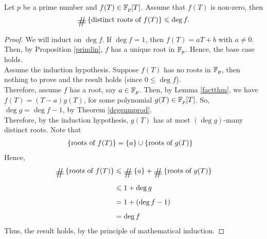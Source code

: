 \begin{theorem}
Let $p$ be a prime number and $f(T) \in \mathbb F_p[T]$. Assume that $f(T)$ is non-zero, then \[\card\set{\text{distinct roots of $f(T)$}} \leq \deg f.\]
\end{theorem}
\begin{proof}
We will induct on $\deg f$. If $\deg f = 1$, then $f(T) = aT + b$ with $a \neq \overline{0}$. Then, by Proposition \ref{primlin}, $f$ has a unique root in $\mathbb F_p$. Hence, the base case holds.\\[0.5em]
Assume the induction hypothesis. Suppose $f(T)$ has no roots in $\mathbb F_p$, then nothing to prove and the result holds (since $0 \leq \deg f$).\\[0.5em]
Therefore, assume $f$ has a root, say $a \in \mathbb F_p$. Then, by Lemma \ref{factthm}, we have $f(T) = (T - a)g(T)$, for some polynomial $g(T) \in \mathbb F_p[T]$. So, $\deg g = \deg f - 1$, by Theorem \ref{degsumprod}.\\[0.5em]
Therefore, by the induction hypothesis, $g(T)$ has at most $(\deg g)$-many distinct roots. Note that 
\begin{align*}
\left\{\text{roots of $f(T)$}\right\} &= \left\{a\right\} \cup \left\{\text{roots of $g(T)$}\right\}
\end{align*}
Hence,\\[-2em]
\begin{align*}
\card\set{\text{roots of $f(T)$}} &\leq \card\set{a} + \card\set{\text{roots of $g(T)$}}\\[0.5em]
&\leq 1 + \deg g\\[0.5em]
&= 1 + (\deg f - 1)\\[0.5em]
&= \deg f
\end{align*}
Thus, the result holds, by the principle of mathematical induction.
\end{proof}


